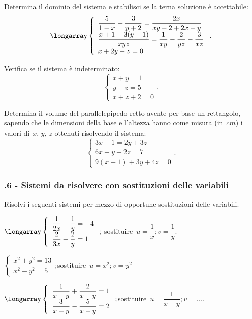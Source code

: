 \begin{esercizio}
 \label{ese:22.61}
Determina il dominio del sistema e stabilisci se la terna soluzione è accettabile:
\[\longarray\left\{\begin{array}{l}\dfrac{5}{1-x}+\dfrac{3}{y+2}=\dfrac{2x}{xy-2+2x-y}\\
\dfrac{x+1-3(y-1)}{xyz}=\dfrac{1}{xy}-\dfrac{2}{yz}-\dfrac{3}{xz}\\
x+2y+z=0\end{array}\right..\]
\end{esercizio}

\begin{esercizio}
 \label{ese:22.62}
Verifica se il sistema è indeterminato:
\[\left\{\begin{array}{l}x+y=1 \\y-z=5
\\x+z+2=0 \end{array}\right..\]
\end{esercizio}

\begin{esercizio}
 \label{ese:22.63}
Determina il volume del parallelepipedo retto avente
per base un rettangolo, sapendo che le dimensioni della base e
l'altezza hanno come misura (in~$\unit{cm}$) i valori
di~$x$, $y$, $z$ ottenuti risolvendo il sistema:
\[\left\{\begin{array}{l}3x+1=2y+3z \\6x+y+2z=7
\\9(x-1)+3y+4z=0 \end{array}\right..\]
\end{esercizio}


\subsubsection*{\thechapter.6 - Sistemi da risolvere con sostituzioni delle variabili}
\begin{esercizio}[\Ast]
 \label{ese:22.64}
 Risolvi i seguenti sistemi per mezzo di opportune sostituzioni delle variabili.

\begin{enumeratea}
\item $\longarray\left\{\begin{array}{l}\dfrac{1}{2x}+\dfrac{1}{y}=-4\\\dfrac{2}{3x}+\dfrac{2}{y}=1\end{array}\right.;$ \quad sostituire~$u=\dfrac{1}{x};v=\dfrac{1}{y}$.
\item $\left\{\begin{array}{l}x^{2}+y^{2}=13\\x^{2}-y^{2}=5 \end{array}\right.;$\quad sostituire~$u=x^{2};v=y^{2}$
\item $\longarray\left\{\begin{array}{l}\dfrac{1}{x+y}+\dfrac{2}{x-y}=1\\\dfrac{3}{x+y}-\dfrac{5}{x-y}=2\end{array}\right.;$\quad sostituire~$u=\dfrac{1}{x+y};v=\ldots$.
\end{enumeratea}
\end{esercizio}

